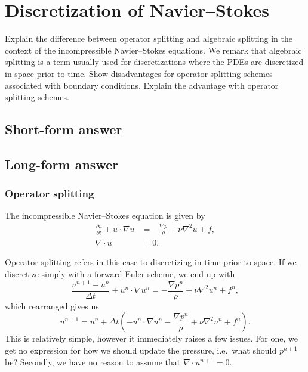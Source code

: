 \section{Discretization of Navier--Stokes} %
Explain the difference between operator splitting and algebraic splitting in the context of the incompressible Navier--Stokes equations. %
We remark that algebraic splitting is a term usually used for discretizations where the PDEs are discretized in space prior to time.
Show disadvantages for operator splitting schemes associated with boundary conditions.
Explain the advantage with operator splitting schemes.

\subsection{Short-form answer}


\subsection{Long-form answer}
\subsubsection{Operator splitting} %
The incompressible Navier--Stokes equation is given by %
\begin{equation}
    \begin{split}
        \frac{\partial u}{\partial t} + u \cdot \nabla u
        &= -\frac{\nabla p}{\rho} + \nu \nabla^2 u + f, \\
        \nabla \cdot u &= 0.
    \end{split}
\end{equation}

Operator splitting refers in this case to discretizing in time prior to space.
If we discretize simply with a forward Euler scheme, we end up with
\begin{equation}
    \frac{u^{n+1} - u^n}{\Delta t} + u^n \cdot \nabla u^n
    = -\frac{\nabla p^n}{\rho} + \nu \nabla^2 u^n + f^n,
\end{equation}
which rearranged gives us
\begin{equation}
    u^{n+1} = u^n + \Delta t \left(
        - u^n \cdot \nabla u^n
        -\frac{\nabla p^n}{\rho}
        + \nu \nabla^2 u^n
        + f^n
    \right).
\end{equation}
This is relatively simple, however it immediately raises a few issues.
For one, we get no expression for how we should update the pressure, i.e.\ what should $p^{n+1}$ be?
Secondly, we have no reason to assume that $\nabla \cdot u^{n+1} = 0$.

